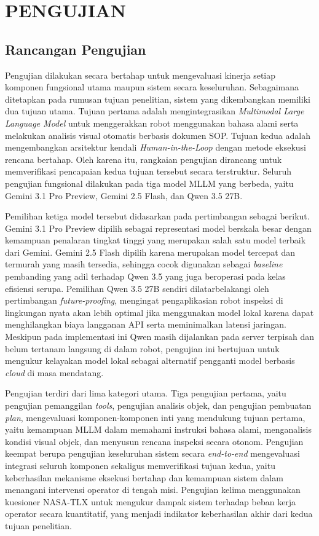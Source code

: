\chapter{PENGUJIAN}
\label{sec:chap4_pengujian}
\vspace{1ex}

\section{Rancangan Pengujian}
\label{sec:deskripsi_pengujian}

Pengujian dilakukan secara bertahap untuk mengevaluasi kinerja setiap komponen fungsional utama maupun sistem secara keseluruhan. Sebagaimana ditetapkan pada rumusan tujuan penelitian, sistem yang dikembangkan memiliki dua tujuan utama. Tujuan pertama adalah mengintegrasikan \textit{Multimodal Large Language Model} untuk menggerakkan robot menggunakan bahasa alami serta melakukan analisis visual otomatis berbasis dokumen SOP. Tujuan kedua adalah mengembangkan arsitektur kendali \textit{Human-in-the-Loop}  dengan metode eksekusi rencana bertahap. Oleh karena itu, rangkaian pengujian dirancang untuk memverifikasi pencapaian kedua tujuan tersebut secara terstruktur. Seluruh pengujian fungsional dilakukan pada tiga model MLLM yang berbeda, yaitu Gemini 3.1 Pro Preview, Gemini 2.5 Flash, dan Qwen 3.5 27B.

Pemilihan ketiga model tersebut didasarkan pada pertimbangan sebagai berikut. Gemini 3.1 Pro Preview dipilih sebagai representasi model berskala besar dengan kemampuan penalaran tingkat tinggi yang merupakan salah satu model terbaik dari Gemini. Gemini 2.5 Flash dipilih karena merupakan model tercepat dan termurah yang masih tersedia, sehingga cocok digunakan sebagai \textit{baseline} pembanding yang adil terhadap Qwen 3.5 yang juga beroperasi pada kelas efisiensi serupa. Pemilihan Qwen 3.5 27B sendiri dilatarbelakangi oleh pertimbangan \textit{future-proofing}, mengingat pengaplikasian robot inspeksi di lingkungan nyata akan lebih optimal jika menggunakan model lokal karena dapat menghilangkan biaya langganan API serta meminimalkan latensi jaringan. Meskipun pada implementasi ini Qwen masih dijalankan pada server terpisah dan belum tertanam langsung di dalam robot, pengujian ini bertujuan untuk mengukur kelayakan model lokal sebagai alternatif pengganti model berbasis \textit{cloud} di masa mendatang.

Pengujian terdiri dari lima kategori utama. Tiga pengujian pertama, yaitu pengujian pemanggilan \textit{tools}, pengujian analisis objek, dan pengujian pembuatan \textit{plan}, mengevaluasi kompo\-nen-kompo\-nen inti yang mendukung tujuan pertama, yaitu kemampuan MLLM dalam memahami instruksi bahasa alami, menganalisis kondisi visual objek, dan menyusun rencana inspeksi secara otonom. Pengujian keempat berupa pengujian keseluruhan sistem secara \textit{end-to-end} mengevaluasi integrasi seluruh komponen sekaligus memverifikasi tujuan kedua, yaitu keberhasilan mekanisme eksekusi bertahap dan kemampuan sistem dalam menangani intervensi operator di tengah misi. Pengujian kelima menggunakan kuesioner NASA-TLX untuk mengukur dampak sistem terhadap beban kerja operator secara kuantitatif, yang menjadi indikator keberhasilan akhir dari kedua tujuan penelitian.

